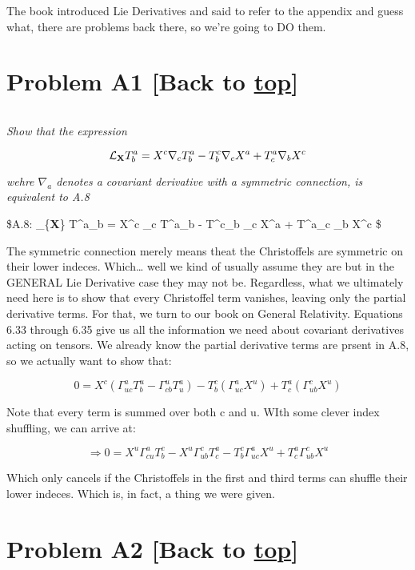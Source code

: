 \documentclass[landscape,letterpaper,10pt,english]{article}
\begin{document}
The book introduced Lie Derivatives and said to refer to the appendix
and guess what, there are problems back there, so we're going to DO
them.

\hypertarget{problem-a1-back-to-top}{%
\section{\texorpdfstring{Problem A1 {[}Back to
\hyperref[toc]{top}{]}}{Problem A1 {[}Back to {]}}}\label{problem-a1-back-to-top}}

\[\label{PA1}\]

\emph{Show that the expression}

\[ \mathcal{L}_{\textbf X} T^a_b = X^c \nabla_c T^a_b - T^c_b \nabla_c X^a + T^a_c \nabla_b X^c \]

\emph{wehre \(\nabla_a\) denotes a covariant derivative with a symmetric
connection, is equivalent to A.8}

\$A.8: \_\{\textbf X\} T\^{}a\_b = X\^{}c \partial\_c
T\^{}a\_b - T\^{}c\_b \partial\_c X\^{}a + T\^{}a\_c \partial\_b X\^{}c
\$

    The symmetric connection merely means theat the Christoffels are
symmetric on their lower indeces. Which\ldots{} well we kind of usually
assume they are but in the GENERAL Lie Derivative case they may not be.
Regardless, what we ultimately need here is to show that every
Christoffel term vanishes, leaving only the partial derivative terms.
For that, we turn to our book on General Relativity. Equations 6.33
through 6.35 give us all the information we need about covariant
derivatives acting on tensors. We already know the partial derivative
terms are prsent in A.8, so we actually want to show that:

\[ 0 = X^c(\Gamma^a_{uc} T^u_b - \Gamma^u_{cb} T^a_u) - T^c_b(\Gamma^a_{uc} X^u) + T^a_c(\Gamma^c_{ub} X^u) \]

    Note that every term is summed over both c and u. WIth some clever index
shuffling, we can arrive at:

\[ \Rightarrow 0 = X^u\Gamma^a_{cu} T^c_b - X^u\Gamma^c_{ub} T^a_c - T^c_b\Gamma^a_{uc} X^u + T^a_c\Gamma^c_{ub} X^u \]

    Which only cancels if the Christoffels in the first and third terms can
shuffle their lower indeces. Which is, in fact, a thing we were given.

    \hypertarget{problem-a2-back-to-top}{%
\section{\texorpdfstring{Problem A2 {[}Back to
\hyperref[toc]{top}{]}}{Problem A2 {[}Back to {]}}}\label{problem-a2-back-to-top}}
\end{document}
